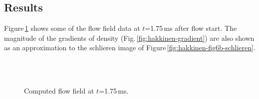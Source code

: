 \subsection{Results}
%
Figure\,\ref{fig:hakkinen-field-data} shows some of the flow field data at $t$=1.75\,ms after flow start.
The magnitude of the gradients of density (Fig.\,\ref{fig:hakkinen-gradient}) are also shown 
as an approximation to the schlieren image of Figure\,\ref{fig:hakkinen-fig6b-schlieren}.

\begin{figure}[htbp]
 \centering
 \\
 \\
 \caption{Computed flow field at $t$=1.75\,ms.}
 \label{fig:hakkinen-field-data}
\end{figure}

